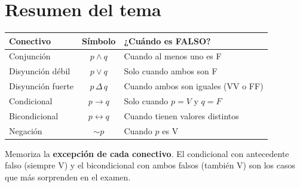 	\section{Resumen del tema}
	
	\begin{cajaformula}
		\begin{center}
			\renewcommand{\arraystretch}{1.5}
			\begin{tabular}{@{}p{3.8cm}cp{6.8cm}@{}}
				\toprule
				\rowcolor{AzulClaro!60}
				\textbf{Conectivo} & \textbf{Símbolo} & \textbf{¿Cuándo es FALSO?} \\
				\midrule
				Conjunción & $p \wedge q$ & Cuando al menos uno es F \\
				\rowcolor{GrisClaro}
				Disyunción débil & $p \vee q$ & Solo cuando ambos son F \\
				Disyunción fuerte & $p\,\Delta\,q$ & Cuando ambos son iguales (VV o FF) \\
				\rowcolor{GrisClaro}
				Condicional & $p \to q$ & Solo cuando $p=V$ y $q=F$ \\
				Bicondicional & $p \leftrightarrow q$ & Cuando tienen valores distintos \\
				\rowcolor{GrisClaro}
				Negación & $\sim p$ & Cuando $p$ es V \\
				\bottomrule
			\end{tabular}
		\end{center}
	\end{cajaformula}
	
	\begin{cajatip}
		Memoriza la \textbf{excepción de cada conectivo}. El condicional con
		antecedente falso (siempre V) y el bicondicional con ambos falsos (también V)
		son los casos que más sorprenden en el examen.
	\end{cajatip}
	
